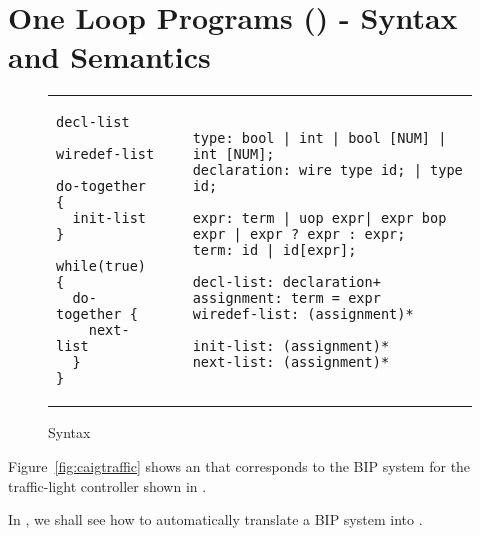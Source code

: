 \section{One Loop Programs (\caig) - Syntax and Semantics}
\label{sec:this}





\begin{figure*}
\begin{tabular}{p{3cm}p{0.2cm}p{10cm}}
\begin{lstlisting}
decl-list

wiredef-list

do-together {
  init-list 
}

while(true) {
  do-together {
    next-list
  } 
}
\end{lstlisting}
&
&
\begin{lstlisting}
type: bool | int | bool [NUM] | int [NUM]; 
declaration: wire type id; | type id;

expr: term | uop expr| expr bop expr | expr ? expr : expr;
term: id | id[expr]; 

decl-list: declaration+
assignment: term = expr
wiredef-list: (assignment)*

init-list: (assignment)* 
next-list: (assignment)* 
\end{lstlisting}
\end{tabular}
\vspace{-2em}
\caption{\caig Syntax}
\label{fig:gr}
\end{figure*}
%
\begin{example}
Figure~\ref{fig:caigtraffic} shows an \caig that corresponds to the BIP system for the traffic-light controller shown in . 

\end{example}
%
In , we shall see how to automatically translate a BIP system into \caig.
